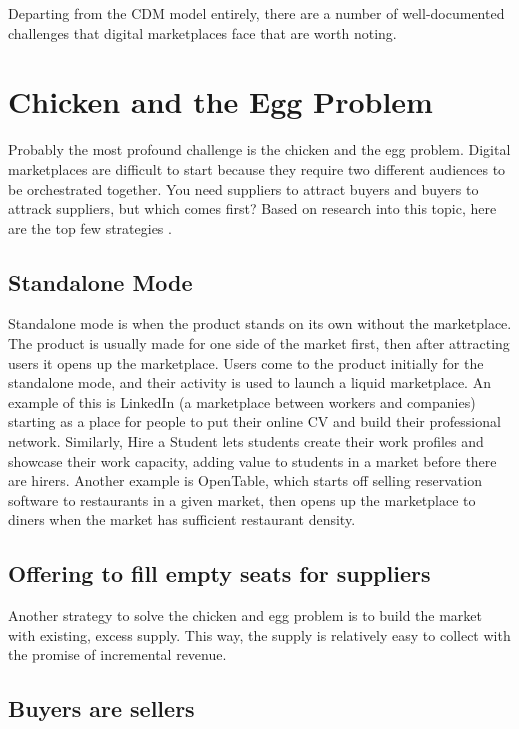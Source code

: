 Departing from the CDM model entirely, there are a number of well-documented challenges that digital marketplaces face that are worth noting.

\section{Chicken and the Egg Problem}

Probably the most profound challenge is the chicken and the egg problem. Digital marketplaces are difficult to start because they require two different audiences to be orchestrated together. You need suppliers to attract buyers and buyers to attrack suppliers, but which comes first? Based on research into this topic, here are the top few strategies \citep{whatsNext}.

\subsection{Standalone Mode}

Standalone mode is when the product stands on its own without the marketplace. The product is usually made for one side of the market first, then after attracting users it opens up the marketplace. Users come to the product initially for the standalone mode, and their activity is used to launch a liquid marketplace. An example of this is LinkedIn (a marketplace between workers and companies) starting as a place for people to put their online CV and build their professional network. Similarly, Hire a Student lets students create their work profiles and showcase their work capacity, adding value to students in a market before there are hirers. Another example is OpenTable, which starts off selling reservation software to restaurants in a given market, then opens up the marketplace to diners when the market has sufficient restaurant density.

\subsection{Offering to fill empty seats for suppliers}

Another strategy to solve the chicken and egg problem is to build the market with existing, excess supply. This way, the supply is relatively easy to collect with the promise of incremental revenue.

\subsection{Buyers are sellers}


